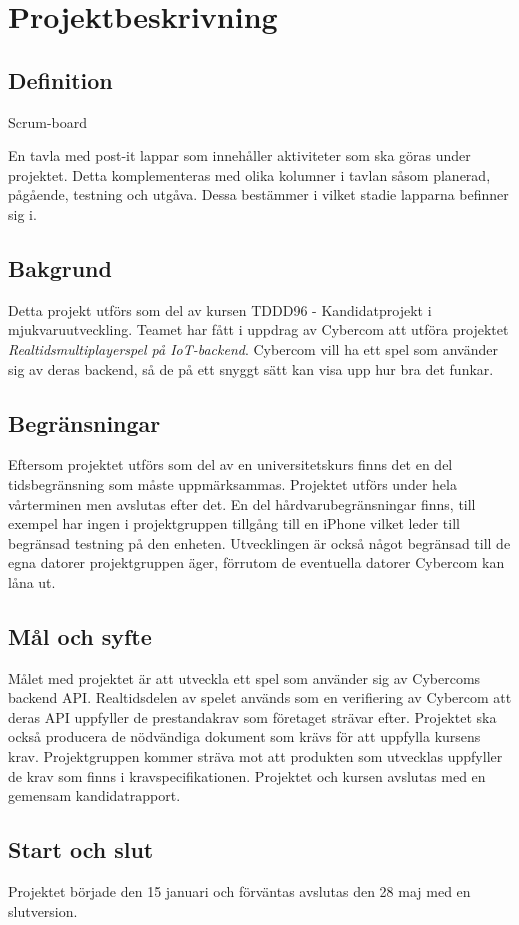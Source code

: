 \section{Projektbeskrivning}

\subsection{Definition}
\begin{labeling}{Scrum-board}
\item [Scrum-board] En tavla med post-it lappar som innehåller aktiviteter som ska göras under 
    projektet. Detta komplementeras med olika kolumner i tavlan såsom planerad, pågående, 
    testning och utgåva. Dessa bestämmer i vilket stadie lapparna befinner sig i. 
\item
\end{labeling}


\subsection{Bakgrund}
Detta projekt utförs som del av kursen TDDD96 - Kandidatprojekt i mjukvaruutveckling. Teamet har fått i uppdrag av Cybercom att utföra projektet \textit{Realtidsmultiplayerspel på IoT-backend}. Cybercom vill ha ett spel som använder sig av deras backend, så de på ett snyggt sätt kan visa upp hur bra det funkar.

\subsection{Begränsningar}
Eftersom projektet utförs som del av en universitetskurs finns det en del tidsbegränsning som måste uppmärksammas. Projektet utförs under hela vårterminen men avslutas efter det. En del hårdvarubegränsningar finns, till exempel har ingen i projektgruppen tillgång till en iPhone vilket leder till begränsad testning på den enheten. Utvecklingen är också något begränsad till de egna datorer projektgruppen äger, förrutom de eventuella datorer Cybercom kan låna ut.

\subsection{Mål och syfte}
Målet med projektet är att utveckla ett spel som använder sig av Cybercoms backend API. Realtidsdelen av spelet används som en verifiering av Cybercom att deras API uppfyller de prestandakrav som företaget strävar efter. Projektet ska också producera de nödvändiga dokument som krävs för att uppfylla kursens krav. Projektgruppen kommer sträva mot att produkten som utvecklas uppfyller de krav som finns i kravspecifikationen. Projektet och kursen avslutas med en gemensam kandidatrapport.



\subsection{Start och slut}
Projektet började den 15 januari och förväntas avslutas den 28 maj med en slutversion.

\pagebreak
